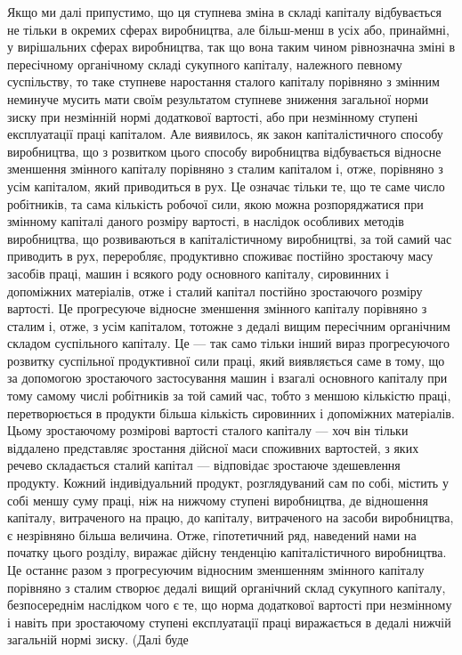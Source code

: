 Якщо ми далі припустимо, що ця ступнева зміна в складі
капіталу відбувається не тільки в окремих сферах виробництва,
але більш-менш в усіх або, принаймні, у вирішальних сферах
виробництва, так що вона таким чином рівнозначна зміні в пересічному
органічному складі сукупного капіталу, належного певному
суспільству, то таке ступневе наростання сталого капіталу
порівняно з змінним неминуче мусить мати своїм результатом
ступневе зниження загальної норми зиску при незмінній нормі
додаткової вартості, або при незмінному ступені експлуатації
праці капіталом. Але виявилось, як закон капіталістичного способу
виробництва, що з розвитком цього способу виробництва
відбувається відносне зменшення змінного капіталу порівняно
з сталим капіталом і, отже, порівняно з усім капіталом, який
приводиться в рух. Це означає тільки те, що те саме число
робітників, та сама кількість робочої сили, якою можна розпоряджатися
при змінному капіталі даного розміру вартості, в наслідок
особливих методів виробництва, що розвиваються в капіталістичному
виробництві, за той самий час приводить в рух,
переробляє, продуктивно споживає постійно зростаючу масу
засобів праці, машин і всякого роду основного капіталу, сировинних
і допоміжних матеріалів, отже і сталий капітал постійно
зростаючого розміру вартості. Це прогресуюче відносне зменшення
змінного капіталу порівняно з сталим і, отже, з усім капіталом,
тотожне з дедалі вищим пересічним органічним складом
суспільного капіталу. Це — так само тільки інший вираз
прогресуючого розвитку суспільної продуктивної сили праці,
який виявляється саме в тому, що за допомогою зростаючого
застосування машин і взагалі основного капіталу при тому самому
числі робітників за той самий час, тобто з меншою кількістю
праці, перетворюється в продукти більша кількість сировинних
і допоміжних матеріалів. Цьому зростаючому розмірові вартості
сталого капіталу — хоч він тільки віддалено представляє зростання
дійсної маси споживних вартостей, з яких речево складається
сталий капітал — відповідає зростаюче здешевлення продукту.
Кожний індивідуальний продукт, розглядуваний сам по
собі, містить у собі меншу суму праці, ніж на нижчому ступені виробництва,
де відношення капіталу, витраченого на працю, до
капіталу, витраченого на засоби виробництва, є незрівняно
більша величина. Отже, гіпотетичний ряд, наведений нами на
початку цього розділу, виражає дійсну тенденцію капіталістичного
виробництва. Це останнє разом з прогресуючим відносним
зменшенням змінного капіталу порівняно з сталим створює дедалі
вищий органічний склад сукупного капіталу, безпосереднім
наслідком чого є те, що норма додаткової вартості при незмінному
і навіть при зростаючому ступені експлуатації праці
виражається в дедалі нижчій загальній нормі зиску. (Далі буде
\parbreak{}  %
